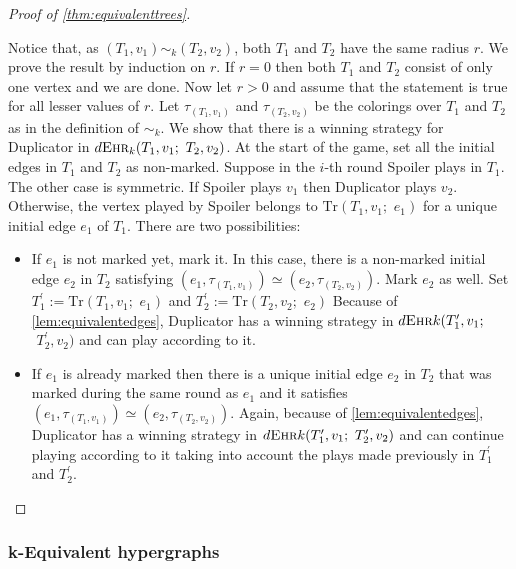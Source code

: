 \documentclass[12pt,notitlepage,a4paper]{article}
\theoremstyle{definition}
\newcommand{\morph}[1]{\sim_#1}
\newcommand{\ehr}{\textsc{Ehr}}
\begin{document}
\begin{proof}[Proof of \cref{thm:equivalenttrees}]~ \par
	Notice that, as $(T_1,v_1)\morph{k} (T_2,v_2)$, both $T_1$ and
	$T_2$ have the same radius $r$.
	We prove the result by induction on $r$.
	If $r=0$ then both $T_1$ and $T_2$ consist
	of only one vertex and we are done.
	Now let $r>0$ and assume that the 
	statement is true for all lesser values of $r$.
	Let $\tau_{(T_1,v_1)}$ and $\tau_{(T_2,v_2)}$ 
	be the colorings over $T_1$ and $T_2$ as in 
	the definition of $\sim_k$. 
	We show that there is a winning strategy 
	for Duplicator in
	$d\ehr_k(T_1,v_1;\,\, T_2,v_2)$.
	At the start of the game, set all the initial edges
	in $T_1$ and $T_2$ as non-marked. 
	Suppose in the $i$-th round Spoiler plays in 
	$T_1$. The other case is symmetric. 
	If Spoiler plays $v_1$ then Duplicator plays $v_2$.
	Otherwise, the vertex played by Spoiler belongs to
	$\mathrm{Tr}(T_1,v_1;\,\,e_1)$
	for a unique initial edge $e_1$ of $T_1$. 
	There are two possibilities:
	\begin{itemize}[leftmargin=*]
		\item If $e_1$ is not marked yet, mark it. 
		In this case, there is a 
		non-marked initial
		edge $e_2$ in $T_2$ satisfying 
		$\left(e_1,\tau_{(T_1,v_1)}\right)\simeq
		\left(e_2,\tau_{(T_2,v_2)}  \right)$.
		Mark $e_2$ as well. 
		Set $T^\prime_1:=\mathrm{Tr}(T_1,v_1;\,\,e_1)$
		and
		$T^\prime_2:=\mathrm{Tr}(T_2,v_2;\,\,e_2)$
		Because of
		\cref{lem:equivalentedges}, Duplicator
		has a winning strategy in
		$ d\ehr{k}(T^\prime_1, v_1;$ $\,\, T^\prime_2,v_2)$
		and can play according to it.
		\item If $e_1$ is already marked then there is
		a unique initial edge $e_2$ in $T_2$ that was 
		marked during the same round as $e_1$ and it satisfies 
		$\left(e_1,\tau_{(T_1,v_1)}\right)\simeq
		\left(e_2,\tau_{(T_2,v_2)}  \right)$.	
		Again, because of \cref{lem:equivalentedges}, 
		Duplicator has a winning strategy in
		$d\ehr{k}(T^\prime_1, v_1; \,\, T^\prime_2,v_2)$
		and can continue playing according to it taking
		into account the plays made previously in 
		$T^\prime_1$ and $T^\prime_2$.	
	\end{itemize}
\end{proof}

\subsubsection{k-Equivalent hypergraphs} \label{sect:equivunicycles}
	
\end{document}
